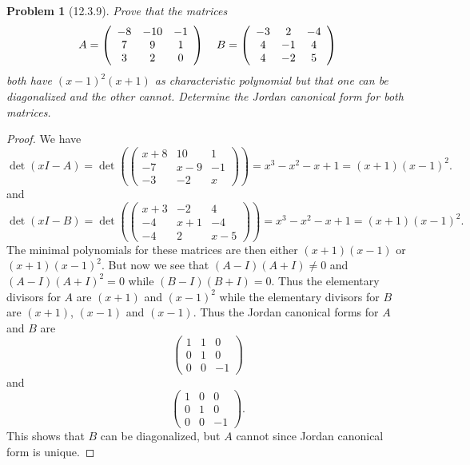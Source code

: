 \documentclass{article}
\newtheorem{problem}{Problem}
\begin{document}
\begin{problem}[12.3.9]
Prove that the matrices
\[
\begin{tabular}{cc}
$
A =
\left (
\begin{array}{ccc}
-8 & -10 & -1\\
7 & 9 & 1\\
3 & 2 & 0
\end{array}
\right )
$
&
$
B =
\left (
\begin{array}{ccc}
-3 & 2 & -4\\
4 & -1 & 4\\
4 & -2 & 5
\end{array}
\right )
$
\end{tabular}
\]
both have $(x-1)^2(x+1)$ as characteristic polynomial but that one can be diagonalized and the other cannot. Determine the Jordan canonical form for both matrices.
\end{problem}
\begin{proof}
We have
\[
\det (xI - A) = \det \left (
\left (
\begin{array}{ccc}
x+8 & 10 & 1\\
-7 & x-9 & -1\\
-3 & -2 & x
\end{array}
\right ) \right )
= x^3 - x^2 - x + 1 = (x+1)(x-1)^2.
\]
and
\[
\det (xI - B) = \det \left (
\left (
\begin{array}{ccc}
x+3 & -2 & 4\\
-4 & x+1 & -4\\
-4 & 2 & x-5
\end{array}
\right ) \right )
= x^3 - x^2 - x + 1 = (x+1)(x-1)^2.
\]
The minimal polynomials for these matrices are then either $(x+1)(x-1)$ or $(x+1)(x-1)^2$. But now we see that $(A-I)(A+I) \neq 0$ and $(A-I)(A+I)^2 = 0$ while $(B-I)(B+I) = 0$. Thus the elementary divisors for $A$ are $(x+1)$ and $(x-1)^2$ while the elementary divisors for $B$ are $(x+1)$, $(x-1)$ and $(x-1)$. Thus the Jordan canonical forms for $A$ and $B$ are
\[
\left (
\begin{array}{ccc}
1 & 1 & 0\\
0 & 1 & 0\\
0 & 0 & -1
\end{array}
\right )
\]
and
\[
\left (
\begin{array}{ccc}
1 & 0 & 0\\
0 & 1 & 0\\
0 & 0 & -1
\end{array}
\right ).
\]
This shows that $B$ can be diagonalized, but $A$ cannot since Jordan canonical form is unique.
\end{proof}
\end{document}
